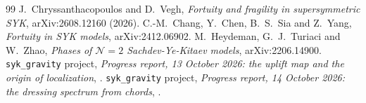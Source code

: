 \documentclass[11pt]{article}
\theoremstyle{plain}
\theoremstyle{remark}
\numberwithin{equation}{section}
\begin{document}
\begin{thebibliography}{99}\small
{} J.~Chryssanthacopoulos and D.~Vegh, \emph{Fortuity and fragility in supersymmetric SYK}, arXiv:2608.12160 (2026).
 C.-M.~Chang, Y.~Chen, B.~S.~Sia and Z.~Yang, \emph{Fortuity in SYK models}, arXiv:2412.06902.
 M.~Heydeman, G.~J.~Turiaci and W.~Zhao, \emph{Phases of $\mathcal N=2$ Sachdev-Ye-Kitaev models}, arXiv:2206.14900.
 \texttt{syk\_gravity} project, \emph{Progress report, 13 October 2026: the uplift map and the origin of localization}, .
 \texttt{syk\_gravity} project, \emph{Progress report, 14 October 2026: the dressing spectrum from chords}, .
\end{thebibliography}
\end{document}
